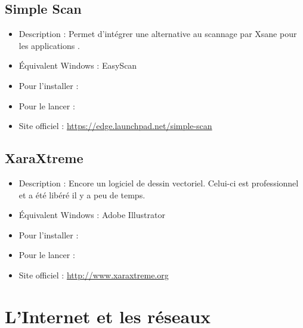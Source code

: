 \subsection{Simple Scan}
\begin{itemize}
\begingroup
{}
\item Description : Permet d'intégrer une alternative au scannage par Xsane pour les applications .{\par}
\item Équivalent Windows : EasyScan{\par}
\item Pour l'installer : 
\item Pour le lancer : 
\item Site officiel : \url{https://edge.launchpad.net/simple-scan}{\par}
\endgroup
\end{itemize}
\subsection{XaraXtreme}
\label{RefXaraXtreme}
\begin{itemize}
\begingroup
{}
\item Description : Encore un logiciel de dessin vectoriel. Celui-ci est professionnel et a été libéré il y a peu de temps.{\par}
\item Équivalent Windows : Adobe Illustrator{\par}
\item Pour l'installer : 
\item Pour le lancer : 
\item Site officiel : \url{http://www.xaraxtreme.org}{\par}
\endgroup
\end{itemize}

\section{L'Internet et les réseaux}
